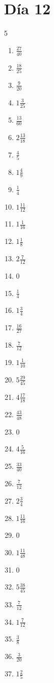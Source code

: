\documentclass[12pt]{article}
\begin{document}
\section*{Día 12}
\begin{multicols}{5}\begin{enumerate}
\item $ \frac{27}{40} $
\item $ \frac{18}{25} $
\item $ \frac{9}{20} $
\item $ 1 \frac{3}{25} $
\item $ \frac{13}{60} $
\item $ 2 \frac{13}{18} $
\item $ \frac{4}{5} $
\item $ 1 \frac{4}{9} $
\item $ \frac{1}{4} $
\item $ 1 \frac{11}{12} $
\item $ 1 \frac{1}{16} $
\item $ 1 \frac{1}{8} $
\item $ 2 \frac{7}{12} $
\item $ 0 $
\item $ \frac{1}{4} $
\item $ 1 \frac{3}{4} $
\item $ \frac{16}{27} $
\item $ \frac{7}{12} $
\item $ 1 \frac{1}{10} $
\item $ 5 \frac{29}{45} $
\item $ 4 \frac{17}{18} $
\item $ \frac{43}{48} $
\item $ 0 $
\item $ 4 \frac{5}{16} $
\item $ \frac{33}{40} $
\item $ \frac{7}{12} $
\item $ 2 \frac{3}{4} $
\item $ 1 \frac{11}{16} $
\item $ 0 $
\item $ 1 \frac{11}{48} $
\item $ 0 $
\item $ 5 \frac{38}{45} $
\item $ \frac{7}{12} $
\item $ 1 \frac{7}{12} $
\item $ \frac{3}{8} $
\item $ \frac{3}{20} $
\item $ 1 \frac{2}{5} $

\end{enumerate}
\end{multicols}
\end{document}

